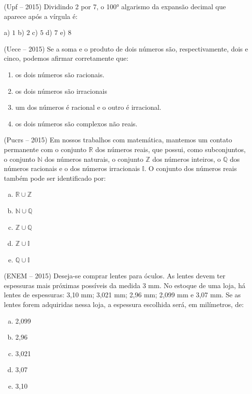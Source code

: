\begin{multicols*}{2}
	\execnum (Upf  --  2015) Dividindo 2 por 7, o 100° algarismo da expansão decimal que aparece após a vírgula é:

	a) $ 1 $ b) $ 2 $ c) $ 5 $ d) $ 7 $ e) $ 8 $

	\execnum (Uece  --  2015) Se a soma e o produto de dois números são, respectivamente, dois e cinco, podemos afirmar corretamente que:

	\begin{enumerate}

		\item  os dois números são racionais.
		\item  os dois números são irracionais
		\item  um dos números é racional e o outro é irracional.
		\item  os dois números são complexos não reais.

	\end{enumerate}

	\execnum (Pucrs  --  2015) Em nossos trabalhos com matemática, mantemos um contato permanente com o conjunto $ \mathbb{R} $ dos números reais, que possui, como subconjuntos, o conjunto $ \mathbb{N} $ dos números naturais, o conjunto $ \mathbb{Z} $ dos números inteiros, o $ \mathbb{Q} $ dos números racionais e o dos números irracionais $ \mathbb{I} $. O conjunto dos números reais também pode ser identificado por:

	\begin{enumerate}[(a)]

		\item $ \mathbb{R} \cup \mathbb{Z} $
		\item $ \mathbb{N} \cup \mathbb{Q} $
		\item $ \mathbb{Z} \cup \mathbb{Q} $
		\item $ \mathbb{Z} \cup \mathbb{I} $
		\item $ \mathbb{Q} \cup \mathbb{I} $

	\end{enumerate}

	\execnum (ENEM  --  2015) Deseja-se comprar lentes para óculos. As lentes devem ter espessuras mais próximas possíveis da medida 3 mm. No estoque de uma loja, há lentes de espessuras: 3,10 mm; 3,021 mm; 2,96 mm; 2,099 mm e 3,07 mm.
	Se as lentes forem adquiridas nessa loja, a espessura escolhida será, em milímetros, de:

	\begin{enumerate}[(a)]

		\item 2,099
		\item 2,96
		\item 3,021
		\item 3,07
		\item 3,10


\end{enumerate}
\end{multicols*}
